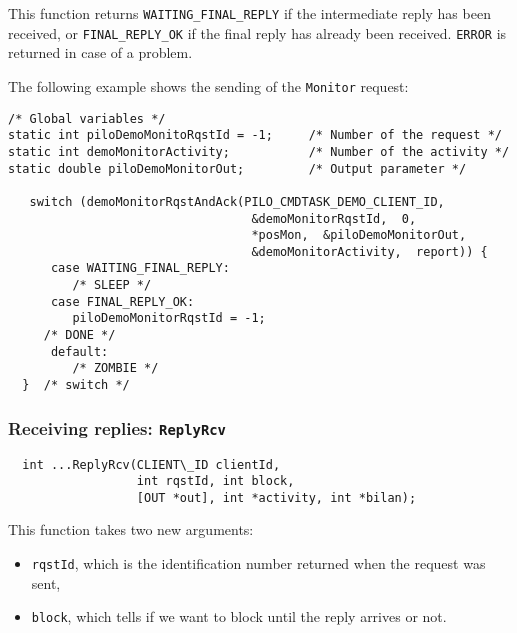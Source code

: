 This function returns {\tt   WAITING\_FINAL\_REPLY} if the   intermediate
reply has been received, or {\tt FINAL\_REPLY\_OK} if the final reply has
already been received. {\tt ERROR} is returned in case of a problem.

\bigbreak

The following example shows the sending of the {\tt Monitor} request:

\begin{center}\begin{cartouche}\small\begin{verbatim}
/* Global variables */
static int piloDemoMonitoRqstId = -1;     /* Number of the request */
static int demoMonitorActivity;           /* Number of the activity */
static double piloDemoMonitorOut;         /* Output parameter */

   switch (demoMonitorRqstAndAck(PILO_CMDTASK_DEMO_CLIENT_ID, 
                                  &demoMonitorRqstId,  0,
                                  *posMon,  &piloDemoMonitorOut, 
                                  &demoMonitorActivity,  report)) {
      case WAITING_FINAL_REPLY:
         /* SLEEP */
      case FINAL_REPLY_OK:
         piloDemoMonitorRqstId = -1;
	 /* DONE */
      default:
         /* ZOMBIE */
  }  /* switch */
\end{verbatim}\end{cartouche}\end{center}


\subsubsection{Receiving replies: {\tt ReplyRcv}}

\begin{center}\begin{cartouche}\small\begin{verbatim}
  int ...ReplyRcv(CLIENT\_ID clientId,
                  int rqstId, int block,
                  [OUT *out], int *activity, int *bilan);
\end{verbatim}\end{cartouche}\end{center}

This function takes two new arguments:
\begin{itemize}
\item {\tt rqstId}, which is the identification number returned when the
request was sent,

\item {\tt block}, which tells if we want to block until the
reply arrives or not.
\end{itemize}

